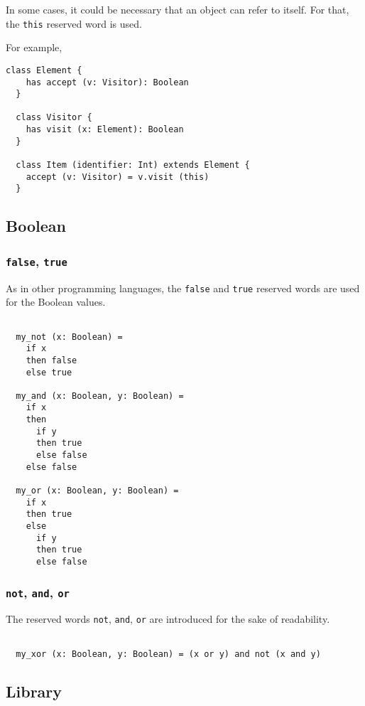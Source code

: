 \documentclass[12pt,a4paper]{article}
\newcommand{\srccode}[1]{\texttt{{#1}}}
\newcommand{\reservedWord}[1]{{\color{blue}\srccode{#1}}\xspace}
\newcommand{\sthis}{\reservedWord{this}}
\newcommand{\sfalse}{\reservedWord{false}}
\newcommand{\strue}{\reservedWord{true}}
\newcommand{\snot}{\reservedWord{not}}
\newcommand{\sand}{\reservedWord{and}}
\newcommand{\sor}{\reservedWord{or}}
\begin{document}
    In some cases, it could be necessary that an object can refer to itself.
    For that, the \sthis reserved word is used.

    For example,
    \begin{lstlisting}[label={lst:exampleWith}]
  class Element {
    has accept (v: Visitor): Boolean
  }

  class Visitor {
    has visit (x: Element): Boolean
  }

  class Item (identifier: Int) extends Element {
    accept (v: Visitor) = v.visit (this)
  }
    \end{lstlisting}

    \subsection{Boolean}

    \subsubsection{\sfalse, \strue}

    As in other programming languages, the \sfalse and \strue reserved words are used for the Boolean values.

    \begin{lstlisting}[label={lst:exampleFalseTrue}]

  my_not (x: Boolean) =
    if x
    then false
    else true

  my_and (x: Boolean, y: Boolean) =
    if x
    then
      if y
      then true
      else false
    else false

  my_or (x: Boolean, y: Boolean) =
    if x
    then true
    else
      if y
      then true
      else false
    \end{lstlisting}

    \subsubsection{\snot, \sand, \sor}

    The reserved words \snot, \sand, \sor are introduced for the sake of readability.

    \begin{lstlisting}[label={lst:exampleNotAndOr}]

  my_xor (x: Boolean, y: Boolean) = (x or y) and not (x and y)

    \end{lstlisting}

    \subsection{Library}
\end{document}
